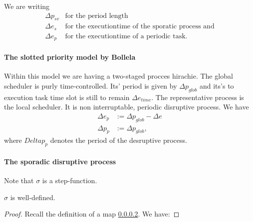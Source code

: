 We are writing
\begin{align}
	\Delta p_{sv} &\text{for the period length} \\
	\Delta e_s &\text{for the executiontime of the sporatic process and}\\ 
	\Delta e_p &\text{for the executiontime of a periodic task.}
\end{align}

\paragraph{The slotted priority model by Bollela}

Within this model we are having a two-staged procces hirachie. 
The global scheduler is purly time-controlled.
Its' period is given by $\Delta p_{glob}$ and its's to execution task time slot is still to remain $\Delta e_{time}$.
The representative process is the local scheduler. 
It is non interruptable, periodic disruptive process.
We have
\begin{align}
\Delta e_p &:= \Delta p_{glob} - \Delta e\\
\Delta p_{p} &:= \Delta p_{glob}, 
\end{align}
where $Delta p_{p}$ denotes the period of the desruptive process.

\paragraph{The sporadic disruptive process}
   	 

\begin{remark}
Note that $\sigma$ is a step-function. 
\end{remark}

\begin{lemma}
 $\sigma$ is well-defined.
\end{lemma}
\begin{proof}
Recall the definition of a map \ref{}. We have:
\end{proof}

